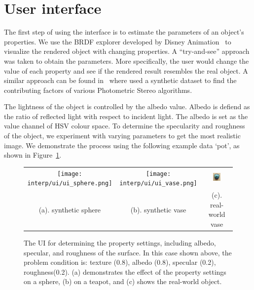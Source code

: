 \section{User interface}
The first step of using the interface is to estimate the parameters of an object's properties. We use the BRDF explorer developed by Disney Animation~\cite{disnybrdf} to visualize the rendered object with changing properties. A ``try-and-see'' approach was taken to obtain the parameters. More specifically, the user would change the value of each property and see if the rendered result resembles the real object. A similar approach can be found in~\cite{Berkiten:2016:ARB} where \citeauthor{Berkiten:2016:ARB} used a synthetic dataset to find the contributing factors of various Photometric Stereo algorithms.

The lightness of the object is controlled by the albedo value. Albedo is defiend as the ratio of reflected light with respect to incident light. The albedo is set as the value channel of HSV colour space. To determine the specularity and roughness of the object, we experiment with varying parameters to get the most realistic image. We demonstrate the process using the following example data `pot', as shown in Figure~\ref{fig:ui}.
\begin{figure}[!htbp]
\centering
\begin{tabular}{ccc}
  \texttt{[image: interp/ui/ui\_sphere.png]}&
  \texttt{[image: interp/ui/ui\_vase.png]}&
  \includegraphics[width=0.3\textwidth]{img/interp/real_world_img/vase/vase.jpg}\\
  (a). synthetic sphere & (b). synthetic vase & (c). real-world vase\\
\end{tabular}
\caption{The UI for determining the property settings, including albedo, specular, and roughness of the surface. In this case shown above, the problem condition is: texture (0.8), albedo (0.8), specular (0.2), roughness(0.2). (a) demonstrates the effect of the property settings on a sphere, (b) on a teapot, and (c) shows the real-world object.}
\label{fig:ui}
\end{figure}


